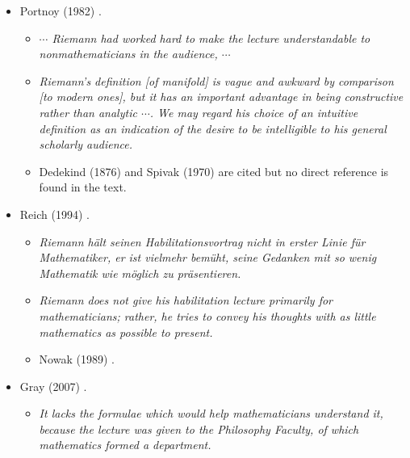 \documentclass[12pt]{article}
\begin{document}
\begin{itemize}
\begin{itemize}
\item[$\bullet$]No reference for the suppression thesis is given.

\end{itemize}

\item[$\bullet$]Portnoy (1982) \cite{Portnoy1982}.

\begin{itemize}

\item[]{\it $\cdots$ Riemann had worked hard to make the lecture understandable to nonmathematicians in the audience, $\cdots$}

\item[]{\it Riemann's definition [of manifold] is vague and awkward by comparison [to modern ones], but it has an important advantage in being constructive rather than analytic $\cdots$. We may regard his choice of an intuitive definition as an indication of the desire to be intelligible to his general scholarly audience.}

\item[$\bullet$]Dedekind (1876) and Spivak (1970) are cited but no direct reference is found in the text.

\end{itemize}

\item[$\bullet$]Reich (1994) \cite{Reich1994}.

\begin{itemize}

\item[]{\it Riemann h\"alt seinen Habilitationsvortrag nicht in erster Linie f\"ur Mathematiker, er ist vielmehr bem\"uht, seine Gedanken mit so wenig Mathematik wie m\"oglich zu pr\"asentieren.}

\item[]{\it Riemann does not give his habilitation lecture primarily for mathematicians; rather, he tries to convey his thoughts with as little mathematics as possible to present.}

\item[$\bullet$]Nowak (1989) \cite{Nowak1989}.

\end{itemize}

\item[$\bullet$]Gray (2007) \cite{Gray2007}.

\begin{itemize}

\item[]{\it It lacks the formulae which would help mathematicians understand it, because the lecture was given to the Philosophy Faculty, of which mathematics formed a department.}


\end{itemize}
\end{itemize}
\end{document}
